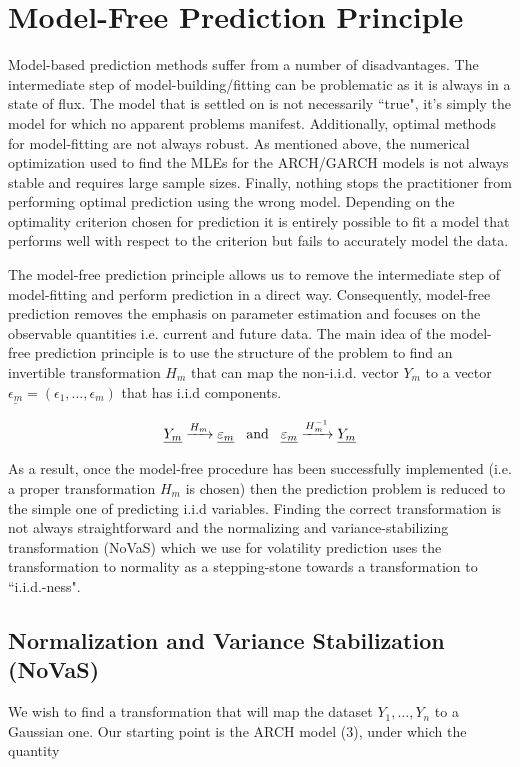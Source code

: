 \documentclass[11pt,]{article}
\begin{document}
\section{Model-Free Prediction Principle} \label{sec:modelfree}
Model-based prediction methods suffer from a number of disadvantages. The intermediate step of model-building/fitting can be problematic as it is always in a state of flux. The model that is settled on is not necessarily ``true", it's simply the model for which no apparent problems manifest. Additionally, optimal methods for model-fitting are not always robust. As mentioned above, the numerical optimization used to find the MLEs for the ARCH/GARCH models is not always stable and requires large sample sizes. Finally, nothing stops the practitioner from performing optimal prediction using the wrong model. Depending on the optimality criterion chosen for prediction it is entirely possible to fit a model that performs well with respect to the criterion but fails to accurately model the data.

The model-free prediction principle allows us to remove the intermediate step of model-fitting and perform prediction in a direct way. Consequently, model-free prediction removes the emphasis on parameter estimation and focuses on the observable quantities i.e. current and future data. The main idea of the model-free prediction principle is to use the structure of the problem to find an invertible transformation $H_m$ that can map the non-i.i.d. vector $Y_m$ to a vector $\underline{\epsilon_m} = (\epsilon_1, \dots, \epsilon_m)$ that has i.i.d components.

\begin{equation}
\underline{Y_m} \xrightarrow{H_m} \underline{\epsilon_m} \hspace{0.3cm} \text{and} \hspace{0.3cm} 
\underline{\epsilon_m} \xrightarrow{H_{m}^{-1}} \underline{Y_m}
\end{equation}

As a result, once the model-free procedure has been successfully implemented (i.e. a proper transformation $H_m$ is chosen) then the prediction problem is reduced to the simple one of predicting i.i.d variables. Finding the correct transformation is not always straightforward and the normalizing and variance-stabilizing transformation (NoVaS) which we use for volatility prediction uses the transformation to normality as a stepping-stone towards a transformation to ``i.i.d.-ness".

\subsection{Normalization and Variance Stabilization (NoVaS)}
We wish to find a transformation that will map the dataset $Y_1,\dots,Y_n$ to a Gaussian one. Our starting point is the ARCH model (3), under which the quantity
\end{document}

